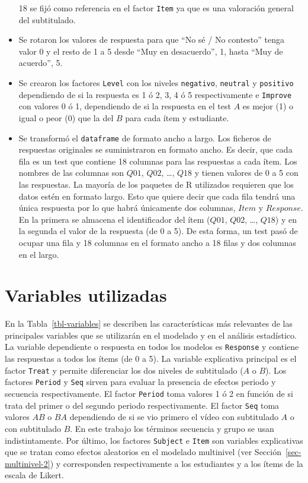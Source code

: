 \documentclass[
  12pt,
  a4paper,
  extrafontsizes,
  onecolumn,
  openright,
  table]{memoir}
\begin{document}
\begin{itemize}
  18 se fijó como referencia en el factor \texttt{Item} ya que es una
  valoración general del subtitulado.
\item
  Se rotaron los valores de respuesta para que \enquote{No sé / No
  contesto} tenga valor 0 y el resto de 1 a 5 desde \enquote{Muy en
  desacuerdo}, 1, hasta \enquote{Muy de acuerdo}, 5.
\item
  Se crearon los factores \texttt{Level} con los niveles
  \texttt{negativo}, \texttt{neutral} y \texttt{positivo} dependiendo de
  si la respuesta es 1 ó 2, 3, 4 ó 5 respectivamente e \texttt{Improve}
  con valores 0 ó 1, dependiendo de si la respuesta en el test \(A\) es
  mejor (1) o igual o peor (0) que la del \(B\) para cada ítem y
  estudiante.
\item
  Se transformó el \texttt{dataframe} de formato ancho a largo. Los
  ficheros de respuestas originales se suministraron en formato ancho.
  Es decir, que cada fila es un test que contiene 18 columnas para las
  respuestas a cada ítem. Los nombres de las columnas son \(Q01\),
  \(Q02\), \ldots, \(Q18\) y tienen valores de 0 a 5 con las respuestas.
  La mayoría de los paquetes de R utilizados requieren que los datos
  estén en formato largo. Esto que quiere decir que cada fila tendrá una
  única respuesta por lo que habrá únicamente dos columnas, \(Item\) y
  \(Response\). En la primera se almacena el identificador del ítem
  (\(Q01\), \(Q02\), \ldots, \(Q18\)) y en la segunda el valor de la
  respuesta (de 0 a 5). De esta forma, un test pasó de ocupar una fila y
  18 columnas en el formato ancho a 18 filas y dos columnas en el largo.
\end{itemize}

\hypertarget{variables-utilizadas}{%
\section{Variables utilizadas}\label{variables-utilizadas}}

En la Tabla~\ref{tbl-variables} se describen las características más
relevantes de las principales variables que se utilizarán en el modelado
y en el análisis estadístico. La variable dependiente o respuesta en
todos los modelos es \texttt{Response} y contiene las respuestas a todos
los ítems (de 0 a 5). La variable explicativa principal es el factor
\texttt{Treat} y permite diferenciar los dos niveles de subtitulado
(\(A\) o \(B\)). Los factores \texttt{Period} y \texttt{Seq} sirven para
evaluar la presencia de efectos periodo y secuencia respectivamente. El
factor \texttt{Period} toma valores 1 ó 2 en función de si trata del
primer o del segundo periodo respectivamente. El factor \texttt{Seq}
toma valores \(AB\) o \(BA\) dependiendo de si se vio primero el vídeo
con subtitulado \(A\) o con subtitulado \(B\). En este trabajo los
términos secuencia y grupo se usan indistintamente. Por último, los
factores \texttt{Subject} e \texttt{Item} son variables explicativas que
se tratan como efectos aleatorios en el modelado multinivel (ver
Sección~\ref{sec-multinivel-2}) y corresponden respectivamente a los
estudiantes y a los ítems de la escala de Likert.
\end{document}
